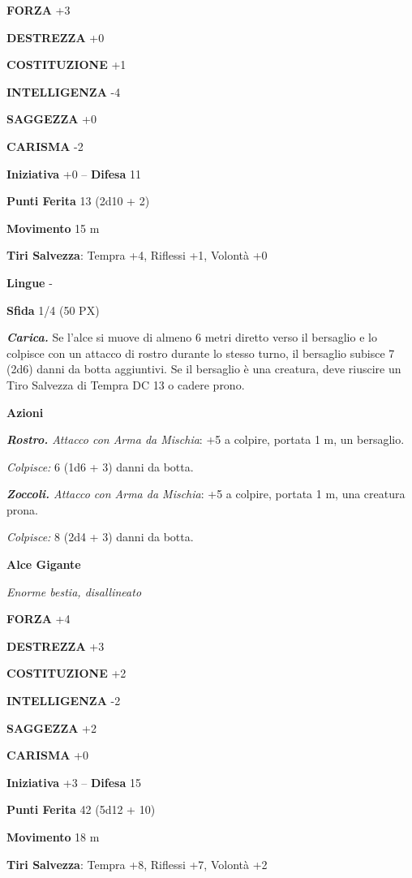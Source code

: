 \begin{multicols}{2}
	\textbf{FORZA} +3

	\textbf{DESTREZZA} +0

	\textbf{COSTITUZIONE} +1

	\textbf{INTELLIGENZA} -4

	\textbf{SAGGEZZA} +0

	\textbf{CARISMA} -2

	\textbf{Iniziativa} +0 -- \textbf{Difesa} 11

	\textbf{Punti Ferita} 13 (2d10 + 2)

	\textbf{Movimento} 15 m

	\textbf{Tiri Salvezza}: Tempra +4, Riflessi +1, Volontà +0

	\textbf{Lingue} -

	\textbf{Sfida} 1/4 (50 PX)

	\textit{\textbf{Carica.}} Se l'alce si muove di almeno 6 metri diretto verso il bersaglio e lo colpisce con un attacco di rostro durante lo stesso turno, il bersaglio subisce 7 (2d6) danni da botta aggiuntivi. Se il bersaglio è una creatura, deve riuscire un Tiro Salvezza di Tempra
	DC 13 o cadere prono.

	\textbf{Azioni}

	\textit{\textbf{Rostro.} Attacco con Arma da Mischia}: +5 a colpire, portata 1 m, un bersaglio.

	\textit{Colpisce:} 6 (1d6 + 3) danni da botta.

	\textit{\textbf{Zoccoli.} Attacco con Arma da Mischia}: +5 a colpire, portata 1 m, una creatura prona.

	\textit{Colpisce:} 8 (2d4 + 3) danni da botta.

	\medskip\textbf{Alce Gigante}

	\textit{Enorme bestia, disallineato}

	\textbf{FORZA} +4

	\textbf{DESTREZZA} +3

	\textbf{COSTITUZIONE} +2

	\textbf{INTELLIGENZA} -2

	\textbf{SAGGEZZA} +2

	\textbf{CARISMA} +0

	\textbf{Iniziativa} +3 -- \textbf{Difesa} 15

	\textbf{Punti Ferita} 42 (5d12 + 10)

	\textbf{Movimento} 18 m

	\textbf{Tiri Salvezza}: Tempra +8, Riflessi +7, Volontà +2


\end{multicols}
